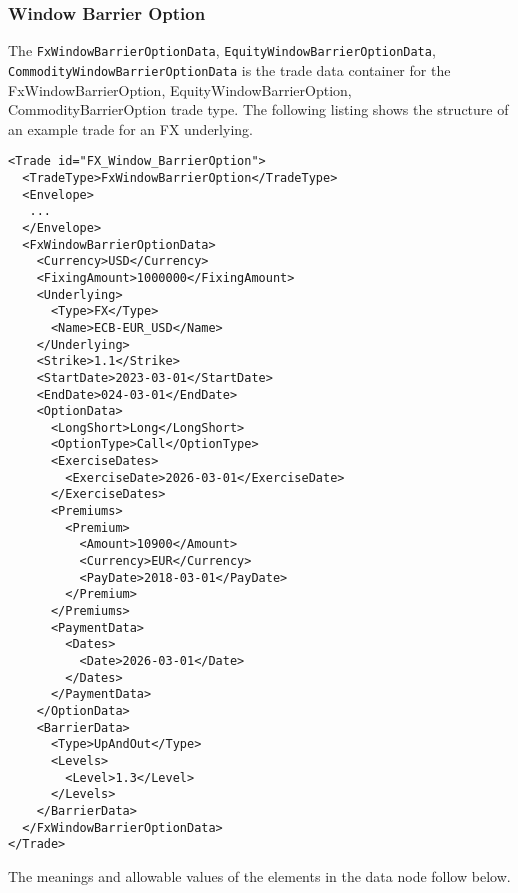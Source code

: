 \subsubsection{Window Barrier Option}

The \verb+FxWindowBarrierOptionData+, \verb+EquityWindowBarrierOptionData+, \verb+CommodityWindowBarrierOptionData+ is
the trade data container for the FxWindowBarrierOption, EquityWindowBarrierOption, CommodityBarrierOption trade
type. The following listing shows the structure of an example trade for an FX underlying.

\begin{verbatim}
<Trade id="FX_Window_BarrierOption">
  <TradeType>FxWindowBarrierOption</TradeType>
  <Envelope>
   ...
  </Envelope>
  <FxWindowBarrierOptionData>
    <Currency>USD</Currency>
    <FixingAmount>1000000</FixingAmount>
    <Underlying>
      <Type>FX</Type>
      <Name>ECB-EUR_USD</Name>
    </Underlying>
    <Strike>1.1</Strike>
    <StartDate>2023-03-01</StartDate>
    <EndDate>024-03-01</EndDate>
    <OptionData>
      <LongShort>Long</LongShort>
      <OptionType>Call</OptionType>
      <ExerciseDates>
        <ExerciseDate>2026-03-01</ExerciseDate>
      </ExerciseDates>
      <Premiums>
        <Premium>
          <Amount>10900</Amount>
          <Currency>EUR</Currency>
          <PayDate>2018-03-01</PayDate>
        </Premium>
      </Premiums>
      <PaymentData>
        <Dates>
          <Date>2026-03-01</Date>
        </Dates>
      </PaymentData>
    </OptionData>
    <BarrierData>
      <Type>UpAndOut</Type>
      <Levels>
        <Level>1.3</Level>
      </Levels>
    </BarrierData>
  </FxWindowBarrierOptionData>
</Trade>
\end{verbatim}

The meanings and allowable values of the elements in the data node follow below.

